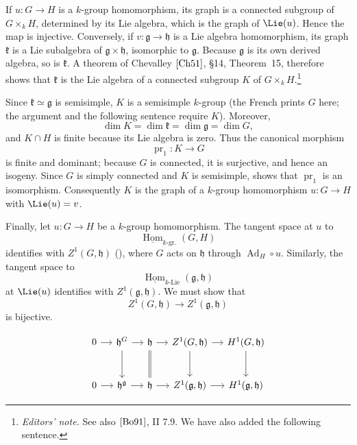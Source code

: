 If \(u:G\to H\) is a \(k\)-group homomorphism, its graph is a connected
subgroup of \(G\times_k H\), determined by its Lie algebra, which is
the graph of \(\Lie(u)\). Hence the map is injective. Conversely, if
\(v:\mathfrak g\to\mathfrak h\) is a Lie algebra homomorphism, its
graph \(\mathfrak k\) is a Lie subalgebra of
\(\mathfrak g\times\mathfrak h\), isomorphic to \(\mathfrak g\).
Because \(\mathfrak g\) is its own derived algebra, so is
\(\mathfrak k\). A theorem of Chevalley
\([{\rm Ch51}]\), \S14, Theorem~15, therefore shows that
\(\mathfrak k\) is the Lie algebra of a connected subgroup \(K\) of
\(G\times_k H\).\footnote{\textit{Editors' note.} See also
\([{\rm Bo91}]\), II 7.9. We have also added the following sentence.}

Since \(\mathfrak k\simeq\mathfrak g\) is semisimple, \(K\) is a
semisimple \(k\)-group (the French prints \(G\) here; the argument
and the following sentence require \(K\)).
Moreover,
\[
  \dim K=\dim\mathfrak k=\dim\mathfrak g=\dim G,
\]
and \(K\cap H\) is finite because its Lie algebra is zero. Thus the
canonical morphism
\[
  \operatorname{pr}_1:K\longrightarrow G
\]
is finite and dominant; because \(G\) is connected, it is surjective,
and hence an isogeny. Since \(G\) is simply connected and \(K\) is
semisimple,  shows that \(\operatorname{pr}_1\) is an
isomorphism. Consequently \(K\) is the graph of a \(k\)-group
homomorphism \(u:G\to H\) with \(\Lie(u)=v\).

Finally, let \(u:G\to H\) be a \(k\)-group homomorphism. The tangent
space at \(u\) to
\[
  \underline{\operatorname{Hom}}_{k\text{-}\mathrm{gr.}}(G,H)
\]
identifies with \(Z^1(G,\mathfrak h)\) (), where
\(G\) acts on \(\mathfrak h\) through
\(\operatorname{Ad}_H\circ u\). Similarly, the tangent space to
\[
  \underline{\operatorname{Hom}}_{k\text{-}\mathrm{Lie}}
    (\mathfrak g,\mathfrak h)
\]
at \(\Lie(u)\) identifies with \(Z^1(\mathfrak g,\mathfrak h)\). We
must show that
\[
  Z^1(G,\mathfrak h)\longrightarrow
  Z^1(\mathfrak g,\mathfrak h)
\]
is bijective.

\[
\begin{tikzcd}[column sep=small,row sep=large]
0 \arrow[r]
&
\mathfrak h^G
  \arrow[r]
  \arrow[d]
&
\mathfrak h
  \arrow[r]
  \arrow[d,equal]
&
Z^1(G,\mathfrak h)
  \arrow[r]
  \arrow[d]
&
H^1(G,\mathfrak h)
  \arrow[d]
\\
0 \arrow[r]
&
\mathfrak h^{\mathfrak g}
  \arrow[r]
&
\mathfrak h
  \arrow[r]
&
Z^1(\mathfrak g,\mathfrak h)
  \arrow[r]
&
H^1(\mathfrak g,\mathfrak h)
\end{tikzcd}


\]

